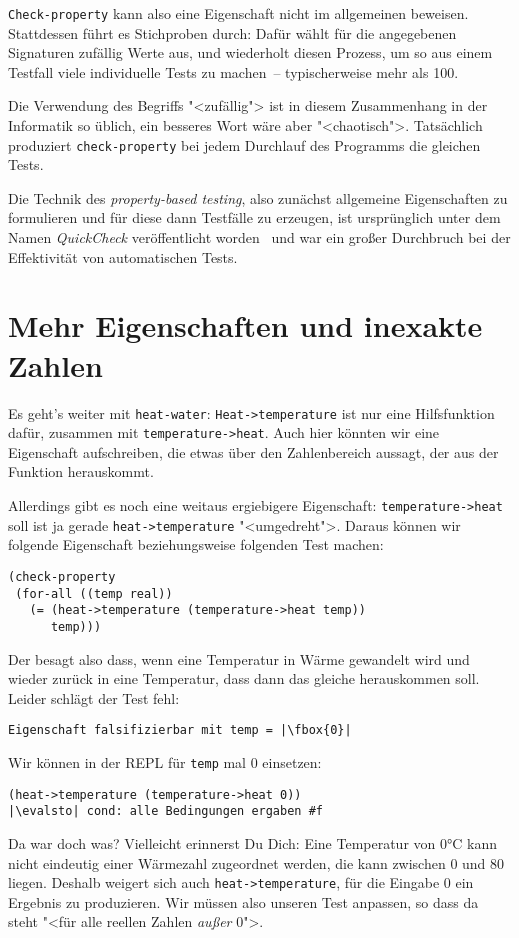 \lstinline{Check-property} kann also eine Eigenschaft nicht im
allgemeinen beweisen.  Stattdessen führt es Stichproben durch: Dafür
wählt für die angegebenen Signaturen zufällig Werte aus, und
wiederholt diesen Prozess, um so aus einem Testfall viele individuelle
Tests zu machen~-- typischerweise mehr als 100.

Die Verwendung des Begriffs "<zufällig"> ist in diesem Zusammenhang in
der Informatik so üblich, ein besseres Wort wäre aber "<chaotisch">.
Tatsächlich produziert \lstinline{check-property} bei jedem Durchlauf
des Programms die gleichen Tests.

Die Technik des \textit{property-based testing}, also zunächst
allgemeine Eigenschaften zu formulieren und für diese dann Testfälle
zu erzeugen, ist ursprünglich unter dem Namen \textit{QuickCheck}
veröffentlicht worden~\cite{ClaessenHughes2000} und war ein
großer Durchbruch bei der Effektivität von automatischen Tests.

\section{Mehr Eigenschaften und inexakte Zahlen}

Es geht's weiter mit \lstinline{heat-water}:
\lstinline{Heat->temperature} ist nur eine Hilfsfunktion dafür,
zusammen mit \lstinline{temperature->heat}.  Auch hier könnten wir
eine Eigenschaft aufschreiben, die etwas über den Zahlenbereich
aussagt, der aus der Funktion herauskommt.

Allerdings gibt es noch eine weitaus ergiebigere Eigenschaft:
\lstinline{temperature->heat} soll ist ja gerade
\lstinline{heat->temperature} "<umgedreht">.  Daraus können wir
folgende Eigenschaft beziehungsweise folgenden Test machen:
%
\begin{lstlisting}
(check-property
 (for-all ((temp real))
   (= (heat->temperature (temperature->heat temp))
      temp)))
\end{lstlisting}
%
Der besagt also dass, wenn eine Temperatur in Wärme gewandelt wird und
wieder zurück in eine Temperatur, dass dann das gleiche herauskommen
soll.  Leider schlägt der Test fehl:
%
\begin{lstlisting}
Eigenschaft falsifizierbar mit temp = |\fbox{0}|
\end{lstlisting}
%
Wir können in der REPL für \lstinline{temp} mal 0 einsetzen:
%
\begin{lstlisting}
(heat->temperature (temperature->heat 0))
|\evalsto| cond: alle Bedingungen ergaben #f
\end{lstlisting}
%
Da war doch was?  Vielleicht erinnerst Du Dich: Eine Temperatur von
0\si{\degree}C kann nicht eindeutig einer Wärmezahl zugeordnet werden,
die kann zwischen 0 und 80 liegen.  Deshalb weigert sich auch
\lstinline{heat->temperature}, für die Eingabe 0 ein Ergebnis zu
produzieren.  Wir müssen also unseren Test anpassen, so dass da steht
"<für alle reellen Zahlen \emph{außer} 0">.

